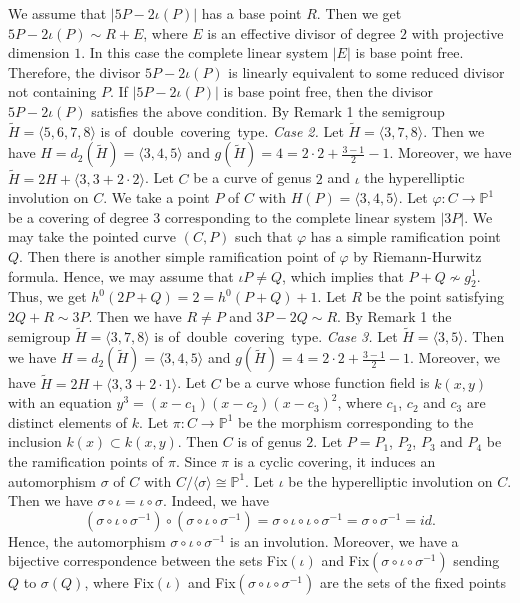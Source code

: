 \documentclass[a4paper,12pt]{article}
\newcommand{\tH}{\tilde{H}}
\newcommand{\la}{\langle}
\newcommand{\ra}{\rangle}
\newcommand{\dis}{\displaystyle}
\newcommand{\DC}{\mbox{of double covering type}}
\begin{document}
We assume that $|5P-2\iota(P)|$ has a base point $R$.
Then we get $5P-2\iota(P)\sim R+E$, where $E$ is an effective divisor of degree $2$ with projective dimension $1$.
In this case the complete linear system $|E|$ is base point free. Therefore, the divisor $5P-2\iota(P)$ is linearly equivalent to some reduced divisor not containing $P$.
If $|5P-2\iota(P)|$ is base point free, then the divisor $5P-2\iota(P)$ satisfies the above condition.
By Remark 1 the semigroup $\tH=\la 5,6,7,8\ra$ is \DC.
\vskip3mm
\noindent
{\it Case 2.} Let $\tH=\la 3,7,8\ra$.
Then we have $H=d_2(\tH)=\la 3,4,5\ra$ and $\dis g(\tH)=4=2\cdot 2+\frac{3-1}{2}-1$.
Moreover, we have $\tH=2H+\la 3,3+2\cdot 2\ra$.
Let $C$ be a curve of genus $2$ and $\iota$ the hyperelliptic involution on $C$.
We take a point $P$ of $C$ with $H(P)=\la 3,4,5\ra$.
Let $\varphi:C\longrightarrow \mathbb{P}^1$ be a covering of degree $3$ corresponding to the complete linear system $|3P|$.
We may take the pointed curve $(C,P)$ such that $\varphi$ has a simple ramification point $Q$.
Then there is another simple ramification point
of $\varphi$ by Riemann-Hurwitz formula.
Hence, we may assume that $\iota P\not=Q$, which implies that $P+Q\not\sim g_2^1$.
Thus, we get $h^0(2P+Q)=2=h^0(P+Q)+1$.
Let $R$ be the point satisfying $2Q+R\sim 3P$.
Then we have $R\not=P$ and $3P-2Q\sim R$.
By Remark 1 the semigroup $\tH=\la 3,7,8\ra$ is \DC.
\vskip3mm
\noindent
{\it Case 3.} Let $\tH=\la 3,5\ra$.
Then we have $H=d_2(\tH)=\la 3,4,5\ra$ and $\dis g(\tH)=4=2\cdot 2+\frac{3-1}{2}-1$.
Moreover, we have $\tH=2H+\la 3,3+2\cdot 1\ra$.
Let $C$ be a curve whose function field is $k(x,y)$ with an equation $y^3=(x-c_1)(x-c_2)(x-c_3)^2$, where $c_1$, $c_2$ and $c_3$ are
distinct elements of $k$.
Let $\pi:C\longrightarrow \mathbb{P}^1$ be the morphism corresponding to the inclusion $k(x)\subset k(x,y)$.
Then $C$ is of genus $2$.
Let $P=P_1$, $P_2$, $P_3$ and $P_4$ be the ramification points of $\pi$.
Since $\pi$ is a cyclic covering, it induces an automorphism $\sigma$ of $C$ with $C/\la \sigma \ra\cong \mathbb{P}^1$.
Let $\iota$ be the hyperelliptic involution on $C$.
Then we have $\sigma\circ\iota=\iota\circ\sigma$.
Indeed, we have
$$(\sigma\circ\iota\circ\sigma^{-1})\circ(\sigma\circ\iota\circ\sigma^{-1})=\sigma\circ\iota\circ\iota\circ\sigma^{-1}=\sigma\circ\sigma^{-1}=id.$$
Hence, the automorphism $\sigma\circ\iota\circ\sigma^{-1}$ is an involution.
Moreover, we have a bijective correspondence between the sets Fix$(\iota)$ and Fix$(\sigma\circ\iota\circ\sigma^{-1})$
sending $Q$ to $\sigma(Q)$, where Fix$(\iota)$ and Fix$(\sigma\circ\iota\circ\sigma^{-1})$ are the sets of the fixed points
\end{document}

